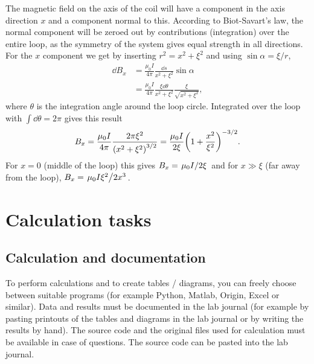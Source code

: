 \documentclass[../Elmag-labhefte-2020.tex]{subfiles}
\begin{document}
The magnetic field on the axis of the coil will have a component in the axis direction $x$ and a component normal to this. According to Biot-Savart's law, the normal component will be zeroed out by contributions (integration) over the entire loop, as the symmetry of the system gives equal strength in all directions. For the $x$ component we get by inserting $r^2 = x^2 + \xi^2$ and using $\sin \alpha = \xi/r$,
%
\begin{align}
    \dd{B_x} &= \frac{\mu_0 I}{4 \pi} \frac{\dd{s}}{x^2 + \xi^2} \sin\alpha \nonumber \\
             &= \frac{\mu_0 I}{4 \pi}  \frac{\xi \dd{\theta}}{x^2 + \xi^2}  \frac{\xi}{\sqrt{x^2 + \xi^2}} ,
\end{align}
where $\theta$ is the integration angle around the loop circle. Integrated over the loop with $\int \dd{\theta} = 2\pi$ gives this result
%
\begin{equation} 
    \label{eq:Biot.Savart3}
    B_x = \frac{\mu_0 I}{4 \pi} \frac{2\pi \xi^2}{\left( x^2 + \xi^2 \right)^{3/2}}
        = \frac{\mu_0 I}{2 \xi} \qty(1 + \frac{x^2}{\xi^2})^{-3/2}.
\end{equation}
For $x = 0$ (middle of the loop) this gives $B_x = \flatfrac{\mu_0 I}{2\xi}$ and for $x \gg \xi$ (far away from the loop), $B_x = \flatfrac{\mu_0 I\xi^2}{2x^3}$.


\section{Calculation tasks \label{ch.magnetfelt.beregn}}

\subsection{Calculation and documentation \label{ch.magnetfelt.regneark}}

To perform calculations and to create tables / diagrams, you can freely choose between suitable programs (for example Python, Matlab, Origin, Excel or similar). Data and results must be documented in the lab journal (for example by pasting printouts of the tables and diagrams in the lab journal or by writing the results by hand). The source code and the original files used for calculation must be available in case of questions. The source code can be pasted into the lab journal.
\end{document}
